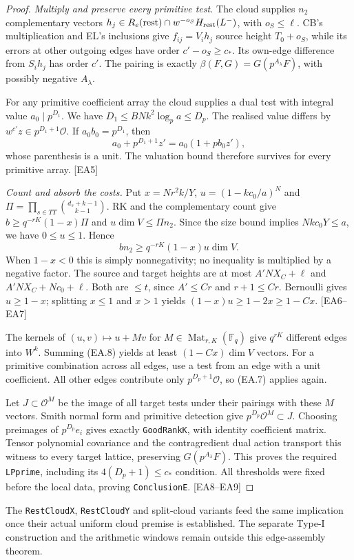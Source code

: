 \begin{proof}
\emph{Multiply and preserve every primitive test.}
The cloud supplies $n_2$ complementary vectors
$h_j\in R_e(\mathrm{rest})\cap w^{-o_S}H_{\rm rest}(L^-)$,
with $o_S\le\ell$. CB's multiplication and EL's inclusions give
$f_{ij}=V_ih_j$ source height $T_0+o_S$, while its errors at other outgoing
edges have order $c'-o_S\ge c_*$. Its own-edge difference from $S_ih_j$
has order $c'$. The pairing is exactly
$\beta(F,G)=G(p^{A_\lambda}F)$, with possibly negative $A_\lambda$.

For any primitive coefficient array the cloud supplies a dual test with
integral value $a_0\mid p^{D_1}$. We have
$D_1\le BNk^2\log_p a\le D_p$. The realised value differs by
$w^{c'}z\in p^{D_1+1}\mathcal O$. If $a_0b_0=p^{D_1}$, then
\[
 a_0+p^{D_1+1}z'=a_0(1+pb_0z'),
 \tag{EA.7}
\]
whose parenthesis is a unit. The valuation bound therefore survives for
every primitive array. \textsf{[EA5]}

\emph{Count and absorb the costs.}
Put $x=Nr^2k/Y$, $u=(1-kc_0/a)^N$ and
$\Pi=\prod_{s\in TT}\binom{d_s+k-1}{k-1}$. RK and the complementary
count give $b\ge q^{-rK}(1-x)\Pi$ and $u\dim V\le\Pi n_2$.
Since the size bound implies $Nkc_0Y\le a$, we have $0\le u\le1$.
Hence
\[
 bn_2\ge q^{-rK}(1-x)u\dim V.
 \tag{EA.8}
\]
When $1-x<0$ this is simply nonnegativity; no inequality is multiplied by
a negative factor. The source and target heights are at most
$A'NX_C+\ell$ and $A'NX_C+Nc_0+\ell$. Both are $\le t$, since
$A'\le Cr$ and $r+1\le Cr$. Bernoulli gives $u\ge1-x$; splitting
$x\le1$ and $x>1$ yields $(1-x)u\ge1-2x\ge1-Cx$.
\textsf{[EA6--EA7]}

The kernels of $(u,v)\mapsto u+Mv$ for
$M\in\operatorname{Mat}_{r,K}(\mathbb F_q)$ give $q^{rK}$ different
edges into $W^k$. Summing (EA.8) yields at least $(1-Cx)\dim V$ vectors.
For a primitive combination across all edges, use a test from an edge
with a unit coefficient. All other edges contribute only
$p^{D_p+1}\mathcal O$, so (EA.7) applies again.

Let $J\subset\mathcal O^M$ be the image of all target tests under their
pairings with these $M$ vectors. Smith normal form and primitive detection
give $p^{D_p}\mathcal O^M\subset J$. Choosing preimages of
$p^{D_p}e_i$ gives exactly \texttt{GoodRankK}, with identity coefficient
matrix. Tensor polynomial covariance and the contragredient dual action
transport this witness to every target lattice, preserving
$G(p^{A_\lambda}F)$. This proves the required \texttt{LPprime}, including
its $4(D_p+1)\le c_*$ condition. All thresholds were fixed before the local
data, proving \texttt{ConclusionE}. \textsf{[EA8--EA9]}
\end{proof}

The \texttt{RestCloudX}, \texttt{RestCloudY} and split-cloud variants feed
the same implication once their actual uniform cloud premise is established.
The separate Type-I construction and the arithmetic windows remain outside
this edge-assembly theorem.
